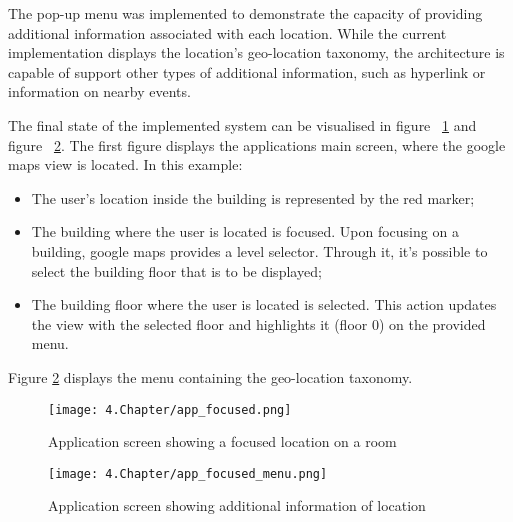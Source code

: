  
The pop-up menu was implemented to demonstrate the capacity of providing additional information associated with each location. While the current implementation displays the location's geo-location taxonomy, the architecture is capable of support other types of additional information, such as hyperlink or information on nearby events.   
 
 
The final state of the implemented system can be visualised in figure ~\ref{fig:AppFocus} and figure ~\ref{fig:AppMenu}. The first figure displays the applications main screen, where the google maps view is located. In this example: 
\begin{itemize} 
\item The user's location inside the building is represented by the red marker; 
\item The building where the user is located is focused. Upon focusing on a building, google maps provides a level selector. Through it, it's possible to select the building floor that is to be displayed; 
\item The building floor where the user is located is selected. This action updates the view with the selected floor and highlights it (floor 0) on the provided menu. 
\end{itemize} 
Figure \ref{fig:AppMenu} displays the menu containing the geo-location taxonomy. 
 
 
\begin{figure} 
\centering 
\texttt{[image: 4.Chapter/app\_focused.png]} 
\caption[Application screen showing a focused location on a room]{Application screen showing a focused location on a room} 
\label{fig:AppFocus} 
\end{figure} 
 
 
\begin{figure} 
\centering 
\texttt{[image: 4.Chapter/app\_focused\_menu.png]} 
\caption[Application screen showing additional information of location]{Application screen showing additional information of location} 
\label{fig:AppMenu} 
\end{figure} 
 
 
 